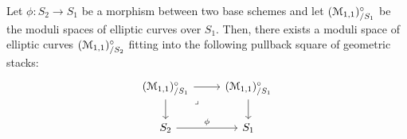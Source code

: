                 \begin{proposition} \label{prop: base_changes_of_moduli_spaces_of_elliptic_curves}
                    Let $\phi: S_2 \to S_1$ be a morphism between two base schemes and let $(\mathcal{M}_{1, 1})_{/S_1}^{\circ}$ be the  moduli spaces of elliptic curves over $S_1$. Then, there exists a moduli space of elliptic curves $(\mathcal{M}_{1, 1})_{/S_2}^{\circ}$ fitting into the following pullback square of geometric stacks:
                        $$
                            \begin{tikzcd}
                            	{(\calM_{1, 1})_{/S_1}^{\circ}} & {(\calM_{1, 1})_{/S_1}^{\circ}} \\
                            	{S_2} & {S_1}
                            	\arrow[from=1-2, to=2-2]
                            	\arrow[from=1-1, to=2-1]
                            	\arrow["{\phi}", from=2-1, to=2-2]
                            	\arrow["{}", from=1-1, to=1-2]
                            	\arrow["\lrcorner"{anchor=center, pos=0.125}, draw=none, from=1-1, to=2-2]
                            \end{tikzcd}
                        $$
                \end{proposition}
